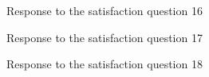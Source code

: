 \documentclass[12pt,oneside,openright,a4paper]{cpe-english-project}
\begin{document}
\begin{figure}[!h]\centering {} \caption{Response to the satisfaction question 16} \end{figure}
\begin{figure}[!h]\centering {} \caption{Response to the satisfaction question 17} \end{figure}
\begin{figure}[!h]\centering {} \caption{Response to the satisfaction question 18} \end{figure}
\end{document}
